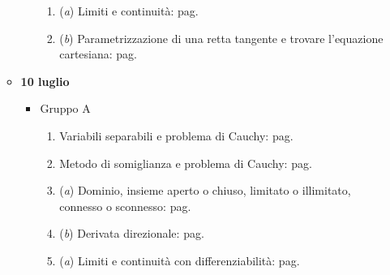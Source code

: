\documentclass[a4paper]{article}
\begin{document}
\begin{itemize}
\begin{itemize}
\begin{itemize}
\begin{enumerate}[label*=Ex. \arabic*), leftmargin = 4em]
					\item (\emph{a}) Limiti e continuità: pag.~\hyperlink{
						exam: esame 21 giugno 2023 - Gruppo A - 4 esercizio (a)
					}{
					}
					
					\setcounter{enumi}{3}
					
					\item (\emph{b}) Parametrizzazione di una retta tangente e trovare l'equazione cartesiana: pag.~\hyperlink{
						exam: esame 21 giugno 2023 - Gruppo A - 4 esercizio (b)
					}{
					}
				\end{enumerate}
			\end{itemize}

			\item \textbf{10 luglio}
			\begin{itemize}
				\item Gruppo A
				\begin{enumerate}[label*=Ex. \arabic*), leftmargin = 4em]
					\item Variabili separabili e problema di Cauchy: pag.~\hyperlink{
						exam: esame 10 luglio 2023 - Gruppo A - 1 esercizio
					}{
					}
					
					\item Metodo di somiglianza e problema di Cauchy: pag.~\hyperlink{
						exam: esame 10 luglio 2023 - Gruppo A - 2 esercizio
					}{
					}
					
					\item (\emph{a}) Dominio, insieme aperto o chiuso, limitato o illimitato, connesso o sconnesso: pag.~\hyperlink{
						exam: esame 10 luglio 2023 - Gruppo A - 3 esercizio (a)
					}{
					}

					\setcounter{enumi}{2}
					
					\item (\emph{b}) Derivata direzionale: pag.~\hyperlink{
						exam: esame 10 luglio 2023 - Gruppo A - 3 esercizio (b)
					}{
					}
					
					\item (\emph{a}) Limiti e continuità con differenziabilità: pag.~\hyperlink{
						exam: esame 10 luglio 2023 - Gruppo A - 4 esercizio (a)	
					}{
					}


\end{enumerate}
\end{itemize}
\end{itemize}
\end{itemize}
\end{document}
